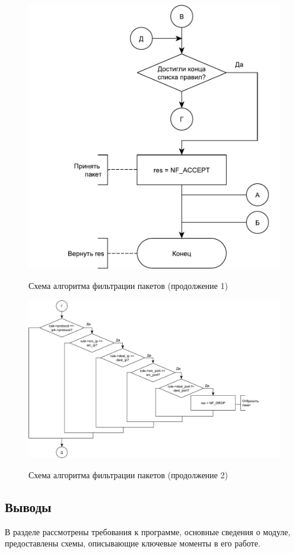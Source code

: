 \begin{figure}[h!]
	\begin{center}
		{\includegraphics[scale = 0.55]{img/filter2.pdf}}
		\caption{Схема алгоритма фильтрации пакетов (продолжение 1)}
		\label{fig10:image}
	\end{center}
\end{figure}

\begin{figure}[h!]
	\begin{center}
		{\includegraphics[scale = 0.55]{img/ifs.pdf}}
		\caption{Схема алгоритма фильтрации пакетов (продолжение 2)}
		\label{fig22:image}
	\end{center}
\end{figure}

\subsection{Выводы}
В разделе рассмотрены требования к программе, основные сведения о модуле, предоставлены схемы, описывающие ключевые моменты в его работе.
